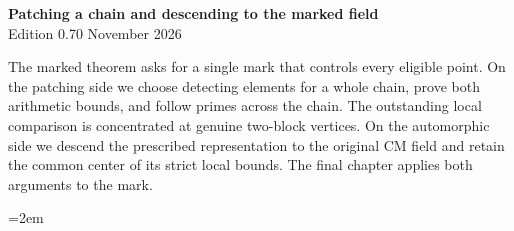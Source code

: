 \begin{center}
{\Large\bfseries Patching a chain and descending to the marked field}\\[4pt]
Edition 0.70  November 2026
\end{center}

The marked theorem asks for a single mark that controls every eligible
point. On the patching side we choose detecting elements for a whole
chain, prove both arithmetic bounds, and follow primes across the chain.
The outstanding local comparison is concentrated at genuine two-block
vertices. On the automorphic side we descend the prescribed representation
to the original CM field and retain the common center of its strict local
bounds. The final chapter applies both arguments to the mark.

\begingroup\emergencystretch=2em






\endgroup
